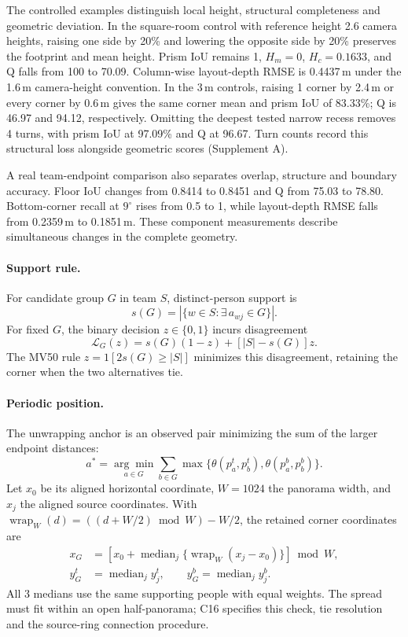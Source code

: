 The controlled examples distinguish local height, structural completeness and geometric deviation. In the square-room control with reference height 2.6 camera heights, raising one side by 20\% and lowering the opposite side by 20\% preserves the footprint and mean height. Prism IoU remains 1, \(H_m=0\), \(H_c=0.1633\), and Q falls from 100 to 70.09. Column-wise layout-depth RMSE is 0.4437\,m under the 1.6\,m camera-height convention. In the 3\,m controls, raising 1 corner by 2.4\,m or every corner by 0.6\,m gives the same corner mean and prism IoU of 83.33\%; Q is 46.97 and 94.12, respectively. Omitting the deepest tested narrow recess removes 4 turns, with prism IoU at 97.09\% and Q at 96.67. Turn counts record this structural loss alongside geometric scores (Supplement A).

A real team-endpoint comparison also separates overlap, structure and boundary accuracy. Floor IoU changes from 0.8414 to 0.8451 and Q from 75.03 to 78.80. Bottom-corner recall at \(9^\circ\) rises from 0.5 to 1, while layout-depth RMSE falls from 0.2359\,m to 0.1851\,m. These component measurements describe simultaneous changes in the complete geometry.

\paragraph{Support rule.}
For candidate group \(G\) in team \(S\), distinct-person support is
\begin{equation}
 s(G)=|\{w\in S:\exists\,a_{wj}\in G\}|.
 \label{eq:supp-support}
\end{equation}
For fixed \(G\), the binary decision \(z\in\{0,1\}\) incurs disagreement
\begin{equation}
 \mathcal L_G(z)=s(G)(1-z)+[|S|-s(G)]z.
 \label{eq:supp-support-disagreement}
\end{equation}
The MV50 rule \(z=\mathrm{1}[2s(G)\geq|S|]\) minimizes this disagreement, retaining the corner when the two alternatives tie.

\paragraph{Periodic position.}
The unwrapping anchor is an observed pair minimizing the sum of the larger endpoint distances:
\begin{equation}
 a^*=\underset{a\in G}{\arg\min}\sum_{b\in G}
 \max\{\theta(p_a^t,p_b^t),\theta(p_a^b,p_b^b)\}.
 \label{eq:supp-position-anchor}
\end{equation}
Let \(x_0\) be its aligned horizontal coordinate, \(W=1024\) the panorama width, and \(x_j\) the aligned source coordinates. With \(\operatorname{wrap}_W(d)=((d+W/2)\bmod W)-W/2\), the retained corner coordinates are
\begin{align}
 x_G&=\left[x_0+\operatorname{median}_j\{\operatorname{wrap}_W(x_j-x_0)\}\right]\bmod W,\label{eq:supp-median-x}\\
 y_G^t&=\operatorname{median}_j y_j^t,\qquad y_G^b=\operatorname{median}_j y_j^b.\label{eq:supp-median-y}
\end{align}
All 3 medians use the same supporting people with equal weights. The spread must fit within an open half-panorama; C16 specifies this check, tie resolution and the source-ring connection procedure.
